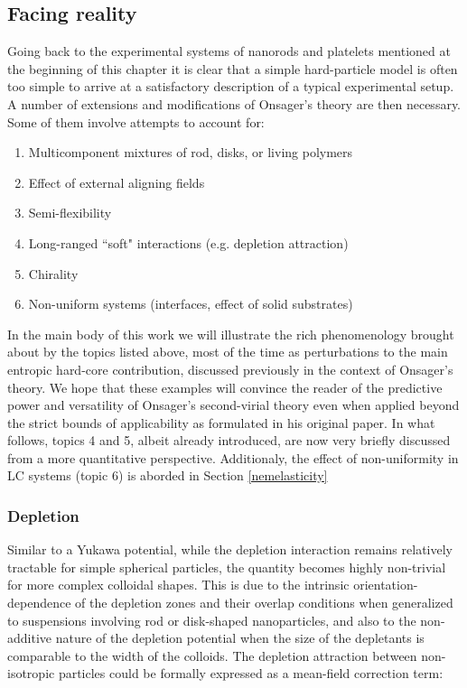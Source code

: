 \subsection{Facing reality}

Going back to the experimental systems of nanorods and platelets mentioned at the beginning of this chapter it is clear that a simple hard-particle model is often too simple to arrive at a satisfactory description of a typical experimental setup. A number of extensions and modifications of Onsager's theory are then necessary. Some of them involve attempts to account for:

\begin{enumerate}
\item Multicomponent mixtures of rod, disks, or living polymers
\item Effect of external aligning fields
\item Semi-flexibility
\item Long-ranged ``soft" interactions (e.g. depletion attraction)
\item Chirality
\item Non-uniform systems (interfaces, effect of solid substrates)
\end{enumerate}

In the main body of this work we will illustrate the rich phenomenology brought about by the topics listed above, most of the time as perturbations to the main entropic hard-core contribution, discussed previously in the context of Onsager's theory. We hope that these examples will convince the reader of the predictive power and versatility of Onsager's second-virial theory even when applied beyond the strict bounds of applicability as formulated in his original paper. In what follows, topics 4 and 5, albeit already introduced, are now very briefly discussed from a more quantitative perspective. Additionaly, the effect of non-uniformity in LC systems (topic 6) is aborded in Section \ref{nemelasticity}

\subsubsection{Depletion}

Similar to a Yukawa potential, while the depletion interaction remains relatively tractable for simple spherical particles, the quantity becomes highly non-trivial for more complex colloidal shapes. This is due to the intrinsic orientation-dependence of the depletion zones and their overlap conditions when generalized to suspensions involving rod or disk-shaped nanoparticles, and also to the non-additive nature of the depletion potential when the size of the depletants is comparable to the width of the colloids. The depletion attraction between non-isotropic particles could be formally expressed as a mean-field correction term:


